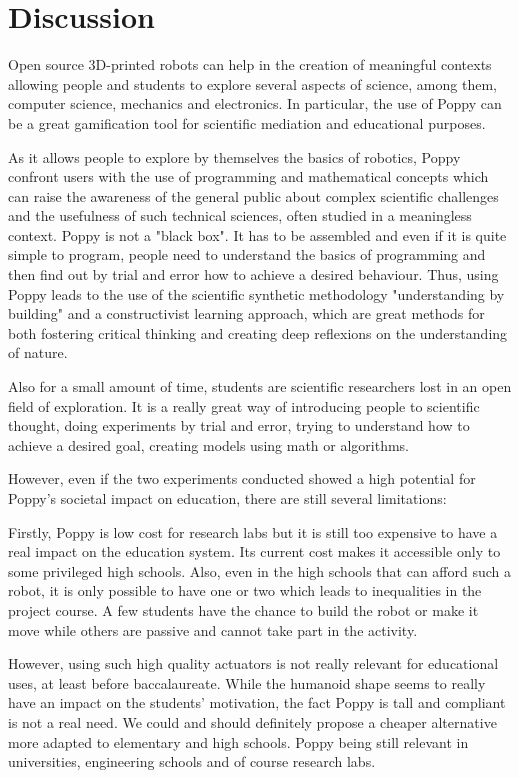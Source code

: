 \section{Discussion} %

Open source 3D-printed robots can help in the creation of meaningful contexts allowing people and students to explore several aspects of science, among them, computer science, mechanics and electronics. In particular, the use of Poppy can be a great gamification tool for scientific mediation and educational purposes.

As it allows people to explore by themselves the basics of robotics, Poppy confront users with the use of programming and mathematical concepts which can raise the awareness of the general public about complex scientific challenges and the usefulness of such technical sciences, often studied in a meaningless context.
Poppy is not a "black box". It has to be assembled and even if it is quite simple to program, people need to understand the basics of programming and then find out by trial and error how to achieve a desired behaviour. Thus, using Poppy leads to the use of the scientific synthetic methodology "understanding by building" and a constructivist learning approach, which are great methods for both fostering critical thinking and creating deep reflexions on the understanding of nature.

Also for a small amount of time, students are scientific researchers lost in an open field of exploration. It is a really great way of introducing people to scientific thought, doing experiments by trial and error, trying to understand how to achieve a desired goal, creating models using math or algorithms.

However, even if the two experiments conducted showed a high potential for Poppy’s societal impact on education, there are still several limitations:

Firstly, Poppy is low cost for research labs but it is still too expensive to have a real impact on the education system. Its current cost makes it accessible only to some privileged high schools. Also, even in the high schools that can afford such a robot, it is only possible to have one or two which leads to inequalities in the project course. A few students have the chance to build the robot or make it move while others are passive and cannot take part in the activity.

However, using such high quality actuators is not really relevant for educational uses, at least before baccalaureate. While the humanoid shape seems to really have an impact on the students’ motivation, the fact Poppy is tall and compliant is not a real need. We could and should definitely propose a cheaper alternative more adapted to elementary and high schools. Poppy being still relevant in universities, engineering schools and of course research labs.

